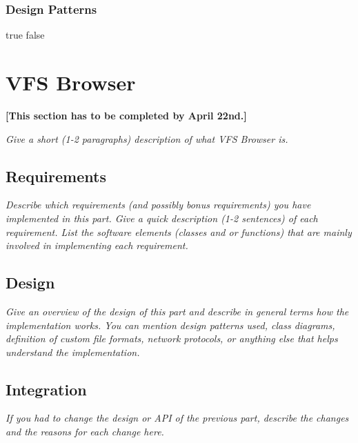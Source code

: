 \documentclass[a4paper,12pt]{article}
\begin{document}
\subsubsection{Design Patterns}

\ifx true false



\section{VFS Browser}

\textbf{[This section has to be completed by April 22nd.]}

\emph{Give a short (1-2 paragraphs) description of what VFS Browser is.}


\subsection{Requirements}

\emph{Describe which requirements (and possibly bonus requirements) you have implemented in this part. Give a quick description (1-2 sentences) of each requirement. List the software elements (classes and or functions) that are mainly involved in implementing each requirement.}


\subsection{Design}

\emph{Give an overview of the design of this part and describe in general terms how the implementation works. You can mention design patterns used, class diagrams, definition of custom file formats, network protocols, or anything else that helps understand the implementation.}


\subsection{Integration}

\emph{If you had to change the design or API of the previous part, describe the changes and the reasons for each change here.}
\end{document}
